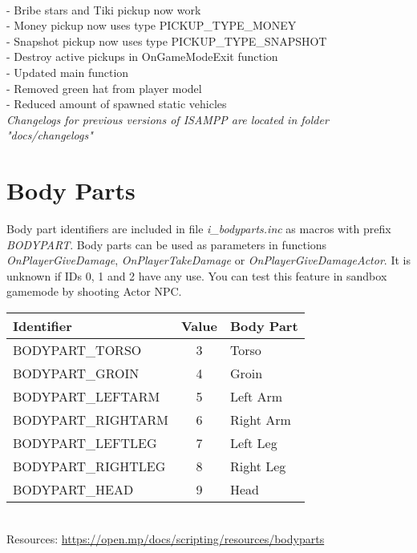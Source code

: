 \documentclass{article}
\begin{document}
\\- Bribe stars and Tiki pickup now work
\\- Money pickup now uses type PICKUP\_TYPE\_MONEY
\\- Snapshot pickup now uses type PICKUP\_TYPE\_SNAPSHOT
\\- Destroy active pickups in OnGameModeExit function
\\- Updated main function
\\- Removed green hat from player model
\\- Reduced amount of spawned static vehicles
\bigskip
\\\textit{Changelogs for previous versions of ISAMPP are located in folder "docs/changelogs"}


\newpage
\section{Body Parts}
\begin{sloppypar}
Body part identifiers are included in file \textit{i\_bodyparts.inc} as macros with prefix \textit{BODYPART}. Body parts can be used as parameters in functions \textit{OnPlayerGiveDamage}, \textit{OnPlayerTakeDamage} or \textit{OnPlayerGiveDamageActor}. It is unknown if IDs 0, 1 and 2 have any use. You can test this feature in sandbox gamemode by shooting Actor NPC.
\end{sloppypar}
\bigskip
\noindent\begin{tabular}{ |l|c|l| } 
\hline
Identifier & Value & Body Part \\
\hline
BODYPART\_TORSO & 3 & Torso \\ 
BODYPART\_GROIN & 4 & Groin \\
BODYPART\_LEFTARM & 5 & Left Arm \\
BODYPART\_RIGHTARM & 6 & Right Arm \\
BODYPART\_LEFTLEG & 7 & Left Leg \\
BODYPART\_RIGHTLEG & 8 & Right Leg \\
BODYPART\_HEAD & 9 & Head \\
\hline
\end{tabular}
\bigskip
\\Resources: \url{https://open.mp/docs/scripting/resources/bodyparts}
\end{document}
